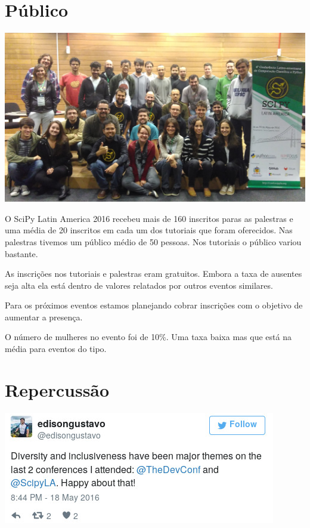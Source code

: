 \documentclass[12pt]{article}
\begin{document}
\newpage

\section*{Público}

\noindent  %
\includegraphics[width=\textwidth]{group.jpg}

O SciPy Latin America 2016 recebeu mais de 160 inscritos paras as palestras e
uma média de 20 inscritos em cada um dos tutoriais que foram oferecidos.
Nas palestras tivemos um público médio de 50 pessoas. Nos tutoriais o público
variou bastante.

As inscrições nos tutoriais e palestras eram gratuitos. Embora a taxa de
ausentes seja alta ela está dentro de valores relatados por outros eventos
similares.

Para os próximos eventos estamos planejando cobrar inscrições com o objetivo de
aumentar a presença.

O número de mulheres no evento foi de 10\%. Uma taxa baixa mas que está na média
para eventos do tipo.

\newpage

\section*{Repercussão}

\noindent  %
\includegraphics[width=\textwidth]{tweet-diversidade.jpg}
\end{document}
